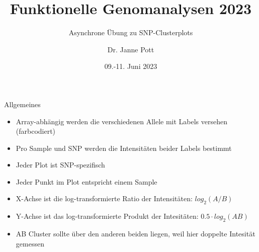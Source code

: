 \documentclass{beamer}
\title{Funktionelle Genomanalysen 2023}
\subtitle{Asynchrone Übung zu SNP-Clusterplots}
\author{Dr. Janne Pott}
\date{09.-11. Juni 2023}
\begin{document}
\begin{frame}
\titlepage
\end{frame}

\begin{frame}{Allgemeines}
    \begin{itemize}
        \item Array-abhängig werden die verschiedenen Allele mit Labels versehen (farbcodiert)
        \item Pro Sample und SNP werden die Intensitäten beider Labels bestimmt
        \item Jeder Plot ist SNP-spezifisch
        \item Jeder Punkt im Plot entspricht einem Sample
        \item X-Achse ist die log-transformierte Ratio der Intensitäten: $log_2(A/B)$
        \item Y-Achse ist das log-transformierte Produkt der Intesitäten: $0.5 \cdot log_2(AB)$
        \item AB Cluster sollte über den anderen beiden liegen, weil hier doppelte Intesität gemessen
    \end{itemize}
\end{frame}
\end{document}
